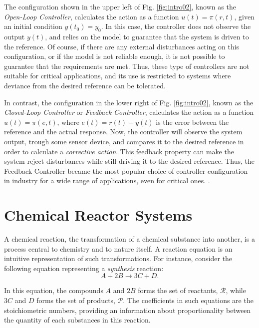 \documentclass[a4paper,11pt]{book}
\numberwithin{figure}{chapter}
\numberwithin{equation}{chapter}
\numberwithin{table}{chapter}
\theoremstyle{definition}
\begin{document}
The configuration shown in the upper left of Fig. \ref{fig:intro02}, known as the \textit{Open-Loop Controller}, calculates the action as a function $u(t) = \pi(r, t)$, given an initial condition $y(t_0) = y_0$. In this case, the controller does not observe the output $y(t)$, and relies on the model to guarantee that the system is driven to the reference. Of course, if there are any external disturbances acting on this configuration, or if the model is not reliable enough, it is not possible to guarantee that the requirements are met. Thus, these type of controllers are not suitable for critical applications, and its use is restricted to systems where deviance from the desired reference can be tolerated. 

In contrast, the configuration in the lower right of Fig. \ref{fig:intro02}, known as the \textit{Closed-Loop Controller} or \textit{Feedback Controller}, calculates the action as a function $u(t) = \pi(e, t)$, where $e(t) = r(t) - y(t)$ is the error between the reference and the actual response. Now, the controller will observe the system output, trough some sensor device, and compares it to the desired reference in order to calculate a \textit{corrective action}. This feedback property can make the system reject disturbances while still driving it to the desired reference. Thus, the Feedback Controller became the most popular choice of controller configuration in industry for a wide range of applications, even for critical ones.  \cite{Syrmos:1997}.

\section{Chemical Reactor Systems}

A chemical reaction, the transformation of a chemical substance into another, is a process central to chemistry and to nature itself. A reaction equation is an intuitive representation of such transformations. For instance, consider the following equation representing a \textit{synthesis} reaction:
\begin{equation}
    A + 2 B \longrightarrow 3 C + D 
.\end{equation} 

\noindent In this equation, the compounds $A$ and $2 B$ forms the set of reactants, $\mathcal{R}$, while $3 C$ and $D$ forms the set of products, $\mathcal{P}$. The coefficients in such equations are the stoichiometric numbers, providing an information about proportionality between the quantity of each substances in this reaction. 
\end{document}

